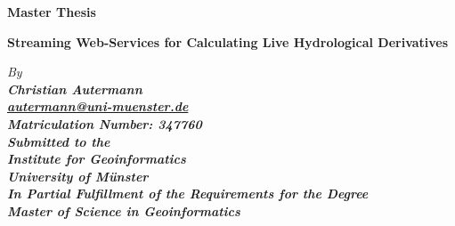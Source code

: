 \documentclass[english,
               paper=a4,
               fontsize=11pt,
               bibliography=totoc,
               listof=nochaptergap,
               listof=notoc,
               numbers=noendperiod,
               parskip=half,
               footnotes=multiple,
               toc=numberline,
               captions=tableheading,
               DIV=9,
              ]{scrreprt}
\newcommand{\mail}[1]{\href{mailto:#1}{#1}}
\renewenvironment{bold}{\bfseries}{}
\newenvironment{italic}{\itshape}{}
\newenvironment{sansserif}{\sffamily}{}
\begin{document}
  \begin{titlepage}
    \begin{spacing}{1}
      \begin{center}
        \begin{large}
          \begin{bold}
            Master Thesis\\
          \end{bold}
          \vspace*{\fill}
          \begin{huge}
            \begin{bold}
              \begin{sansserif}
                Streaming Web-Services for Calculating Live Hydrological Derivatives\\
              \end{sansserif}
            \end{bold}
          \end{huge}
          \vspace*{\fill}
          \begin{italic}
            By\\
          \end{italic}
          \begin{bold}
            Christian Autermann\\
          \end{bold}
          \mail{autermann@uni-muenster.de}\\
          Matriculation Number: 347760\\
          \vspace*{\fill}
          \begin{italic}
            Submitted to the\\
          \end{italic}
          Institute for Geoinformatics\\
          University of Münster\\
          \vspace*{\fill}
          \begin{italic}
            In Partial Fulfillment of the Requirements for the Degree\\
          \end{italic}
          \begin{bold}
            Master of Science in Geoinformatics\\
          \end{bold}
          \vspace*{\fill}

\end{large}
\end{center}
\end{spacing}
\end{titlepage}
\end{document}
